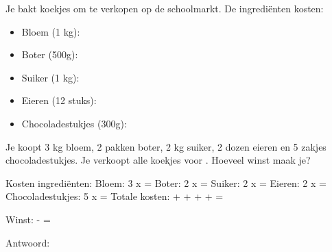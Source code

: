 \begin{opgave}
Je bakt koekjes om te verkopen op de schoolmarkt. De ingrediënten kosten:

\begin{itemize}
\item Bloem (1 kg): 
\item Boter (500g): 
\item Suiker (1 kg): 
\item Eieren (12 stuks): 
\item Chocoladestukjes (300g): 
\end{itemize}

Je koopt 3 kg bloem, 2 pakken boter, 2 kg suiker, 2 dozen eieren en 5 zakjes
chocoladestukjes. Je verkoopt alle koekjes voor . Hoeveel winst
maak je?
\end{opgave}

\begin{oplossing}
Kosten ingrediënten:
Bloem: 3 x  = 
Boter: 2 x  = 
Suiker: 2 x  = 
Eieren: 2 x  = 
Chocoladestukjes: 5 x  = 
Totale kosten:  +  +  +  +  = 

Winst:  -  = 

Antwoord: 
\end{oplossing}